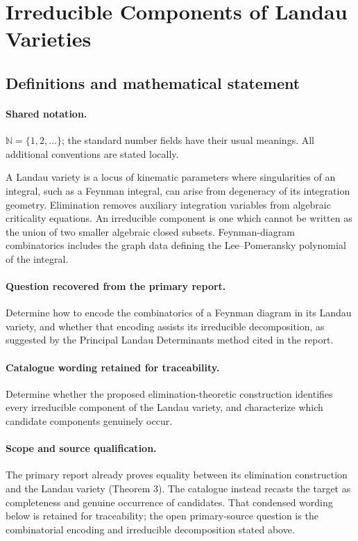 \documentclass[11pt]{article}
\begin{document}
\section{Irreducible Components of Landau Varieties}\label{statement}

\subsection{Definitions and mathematical statement}

\paragraph{Shared notation.}$\mathbb N=\{1,2,\ldots\}$; the standard number fields have their usual meanings. All additional conventions are stated locally.


A Landau variety is a locus of kinematic parameters where singularities of an integral, such as a Feynman integral, can arise from degeneracy of its integration geometry. Elimination removes auxiliary integration variables from algebraic criticality equations. An irreducible component is one which cannot be written as the union of two smaller algebraic closed subsets. Feynman-diagram combinatorics includes the graph data defining the Lee--Pomeransky polynomial of the integral.

\paragraph{Question recovered from the primary report.}Determine how to encode the combinatorics of a Feynman diagram in its Landau variety, and whether that encoding assists its irreducible decomposition, as suggested by the Principal Landau Determinants method cited in the report.

\paragraph{Catalogue wording retained for traceability.}
Determine whether the proposed elimination-theoretic construction identifies every irreducible component of the Landau variety, and characterize which candidate components genuinely occur.

\paragraph{Scope and source qualification.}The primary report already proves equality between its elimination construction and the Landau variety (Theorem 3). The catalogue instead recasts the target as completeness and genuine occurrence of candidates. That condensed wording below is retained for traceability; the open primary-source question is the combinatorial encoding and irreducible decomposition stated above.
\end{document}
